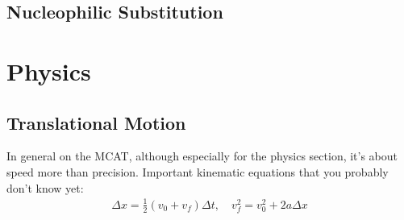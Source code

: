 \documentclass{article}
\theoremstyle{plain}%
\theoremstyle{definition}
\theoremstyle{remark}
\begin{document}
\subsection{Nucleophilic Substitution}



\section{Physics}
\subsection{Translational Motion}
In general on the MCAT, although especially for the physics section, it's about speed more than precision. Important kinematic equations that you probably don't know yet:
\begin{equation}
\begin{split}
\Delta x = \frac{1}{2}\left(v_0+v_f\right)\Delta t, \quad v_f^2=v_0^2+2a\Delta x
\end{split}
\end{equation}
\end{document}
